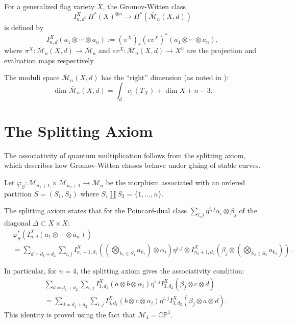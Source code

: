 \begin{Definition}
\label{def:GromovWittenClass}
For a generalized flag variety $X$, the Gromov-Witten class
\[
I_{n,d}^X: H^*(X)^{\otimes n} \to H^*(\overline{\mathcal{M}}_n(X, d))
\]
is defined by
\begin{equation}
I_{n,d}^X(a_1 \otimes \cdots \otimes a_n) := (\pi^X)_* (ev^X)^*(a_1 \otimes \cdots \otimes a_n),
\label{eq:gromov-witten-class}
\end{equation}
where $\pi^X: \overline{\mathcal{M}}_n(X, d) \to \overline{\mathcal{M}}_n$ and $ev^X: \overline{\mathcal{M}}_n(X, d) \to X^n$ are the projection and evaluation maps respectively.
\end{Definition}

The moduli space $\overline{\mathcal{M}}_n(X, d)$ has the ``right'' dimension (as noted in \cite{Kim1996}):
\[
\dim \overline{\mathcal{M}}_n(X, d) = \int_d c_1(T_X) + \dim X + n - 3.
\]

\section{The Splitting Axiom}

The associativity of quantum multiplication follows from the splitting axiom, which describes how Gromov-Witten classes behave under gluing of stable curves.

Let $\varphi_S: \overline{\mathcal{M}}_{n_1+1} \times \overline{\mathcal{M}}_{n_2+1} \to \overline{\mathcal{M}}_n$ be the morphism associated with an ordered partition $S = (S_1, S_2)$ where $S_1 \coprod S_2 = \{1, \ldots, n\}$.

The splitting axiom states that for the Poincar\'e-dual class $\sum_{i,j} \eta^{i,j} \alpha_i \otimes \beta_j$ of the diagonal $\Delta \subset X \times X$:
\begin{equation}
\begin{aligned}
&\varphi_S^*(I_{n,d}^X(a_1 \otimes \cdots \otimes a_n)) \\
&= \sum_{d = d_1 + d_2} \sum_{i,j} I_{n_1+1, d_1}^X\left(\left(\bigotimes_{k_1 \in S_1} a_{k_1}\right) \otimes \alpha_i\right) \eta^{i,j} \otimes I_{n_2+1, d_2}^X\left(\beta_j \otimes \left(\bigotimes_{k_2 \in S_2} a_{k_2}\right)\right).
\end{aligned}
\label{eq:splitting-axiom}
\end{equation}

In particular, for $n=4$, the splitting axiom gives the associativity condition:
\begin{equation}
\begin{aligned}
&\sum_{d = d_1 + d_2} \sum_{i,j} I_{3, d_1}^X(a \otimes b \otimes \alpha_i) \eta^{i,j} I_{3, d_2}^X(\beta_j \otimes c \otimes d) \\
&= \sum_{d = d_1 + d_2} \sum_{i,j} I_{3, d_1}^X(b \otimes c \otimes \alpha_i) \eta^{i,j} I_{3, d_2}^X(\beta_j \otimes a \otimes d).
\end{aligned}
\label{eq:associativity-condition}
\end{equation}
This identity is proved using the fact that $\overline{\mathcal{M}}_4 = \mathbb{CP}^1$.

